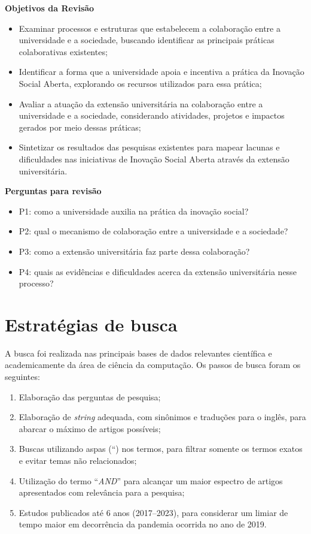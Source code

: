 \textbf{Objetivos da Revisão}
\begin{itemize}
    \item Examinar processos e estruturas que estabelecem a colaboração entre a universidade e a sociedade, buscando identificar as principais práticas colaborativas existentes;
    \item Identificar a forma que a universidade apoia e incentiva a prática da Inovação Social Aberta, explorando os recursos utilizados para essa prática;
    \item Avaliar a atuação da extensão universitária na colaboração entre a universidade e a sociedade, considerando atividades, projetos e impactos gerados por meio dessas práticas;
    \item Sintetizar os resultados das pesquisas existentes para mapear lacunas e dificuldades nas iniciativas de Inovação Social Aberta através da extensão universitária.
    \par\vspace{1\baselineskip}
\end{itemize}

\textbf{Perguntas para revisão}
\begin{itemize}
    \item P1: como a universidade auxilia na prática da inovação social?
    \item P2: qual o mecanismo de colaboração entre a universidade e a sociedade? \cite{brunswicker2018}
    \item P3: como a extensão universitária faz parte dessa colaboração?
    \item P4: quais as evidências e dificuldades acerca da extensão universitária nesse processo? 
\end{itemize}

\section{Estratégias de busca}
A busca foi realizada nas principais bases de dados relevantes científica e academicamente da área de ciência da computação. Os passos de busca foram os seguintes:
\begin{enumerate}
    \item Elaboração das perguntas de pesquisa;
    \item Elaboração de \textit{string} adequada, com sinônimos e traduções para o inglês, para abarcar o máximo de artigos possíveis;
    \item Buscas utilizando aspas (“) nos termos, para filtrar somente os termos exatos e evitar temas não relacionados;
    \item Utilização do termo “\textit{AND}” para alcançar um maior espectro de artigos apresentados com relevância para a pesquisa;
    \item Estudos publicados até 6 anos (2017–2023), para considerar um limiar de tempo maior em decorrência da pandemia ocorrida no ano de 2019. 
\end{enumerate}

